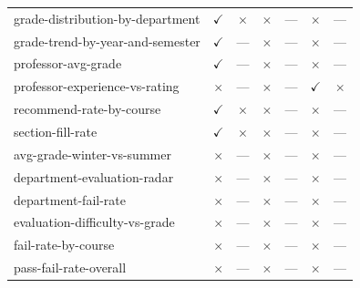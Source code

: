 \begin{longtable}{lcccccc}
grade-distribution-by-department & $\checkmark$ & $\times$ & $\times$ & --- & $\times$ & --- \\
grade-trend-by-year-and-semester & $\checkmark$ & --- & $\times$ & --- & $\times$ & --- \\
professor-avg-grade & $\checkmark$ & --- & $\times$ & --- & $\times$ & --- \\
professor-experience-vs-rating & $\times$ & --- & $\times$ & --- & $\checkmark$ & $\times$ \\
recommend-rate-by-course & $\checkmark$ & $\times$ & $\times$ & --- & $\times$ & --- \\
section-fill-rate & $\checkmark$ & $\times$ & $\times$ & --- & $\times$ & --- \\
avg-grade-winter-vs-summer & $\times$ & --- & $\times$ & --- & $\times$ & --- \\
department-evaluation-radar & $\times$ & --- & $\times$ & --- & $\times$ & --- \\
department-fail-rate & $\times$ & --- & $\times$ & --- & $\times$ & --- \\
evaluation-difficulty-vs-grade & $\times$ & --- & $\times$ & --- & $\times$ & --- \\
fail-rate-by-course & $\times$ & --- & $\times$ & --- & $\times$ & --- \\
pass-fail-rate-overall & $\times$ & --- & $\times$ & --- & $\times$ & --- \\
\end{longtable}
